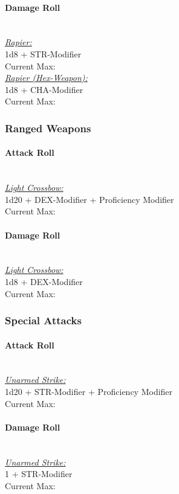 {\paragraph*{Damage Roll}\hfill\\
\underline{\textit{Rapier:}}\\
1d8 + STR-Modifier\\
\indent Current Max: \\
\underline{\textit{Rapier (Hex-Weapon):}}\\
1d8 + CHA-Modifier\\
\indent Current Max: 
\subsubsection*{Ranged Weapons}
\paragraph*{Attack Roll}\hfill\\
\underline{\textit{Light Crossbow:}}\\
1d20 + DEX-Modifier + Proficiency Modifier\\
\indent Current Max: 
\paragraph*{Damage Roll}\hfill\\
\underline{\textit{Light Crossbow:}}\\
1d8 + DEX-Modifier\\
\indent Current Max: 
\subsubsection*{Special Attacks}
\paragraph*{Attack Roll}\hfill\\
\underline{\textit{Unarmed Strike:}}\\
1d20 + STR-Modifier + Proficiency Modifier\\
\indent Current Max: 
\paragraph*{Damage Roll}\hfill\\
\underline{\textit{Unarmed Strike:}}\\
1 + STR-Modifier\\
\indent Current Max: 
}